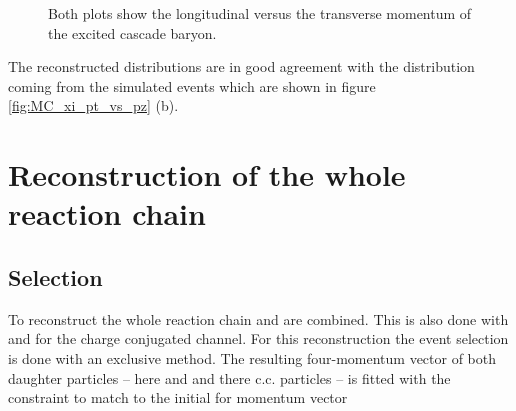 	\begin{figure}
		\centering
		\caption{\propose Both plots show the longitudinal versus the transverse momentum of the excited cascade baryon.}
		\label{fig:xi1820_pt_vs_pz}
	\end{figure}
	
	The reconstructed distributions are in good agreement with the distribution coming from the simulated events which are 
	shown in figure \ref{fig:MC_xi_pt_vs_pz} (b).
	
\section{Reconstruction of the whole reaction chain}

	\subsection*{Selection}
	
	To reconstruct the whole reaction chain \excitedcascade and \anticascade are combined.
	This is also done with \excitedanticascade and \cascade for the charge conjugated channel.
	For this reconstruction the event selection is done with an exclusive method.
	The resulting four-momentum vector of both daughter particles --  here \excitedcascade 
	and \anticascade and there c.c. particles -- is fitted with the constraint to match to the initial for momentum vector  

